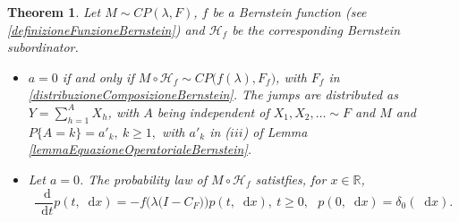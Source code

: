 \documentclass[12pt, twoside, english, headsepline]{article}
\newcommand*\dif{\mathop{}\!\mathrm{d}}  %
\newtheorem{theorem}{Theorem}[section] %
\theoremstyle{definition} %
\numberwithin{equation}{section} %
\begin{document}
%
%	


\begin{theorem}\label{teoremaComposizioneCompoundPoissonConSubordinatore}
Let $M\sim CP(\lambda, F)$, $f$ be a Bernstein function (see \eqref{definizioneFunzioneBernstein}) and $\mathcal{H}_f$ be the corresponding Bernstein subordinator.
\begin{itemize}
	\item[($i$)] $a=0$ if and only if $M\circ \mathcal{H}_f\sim CP\big(f(\lambda), F_f\big)$, with %
	$F_f$ in \eqref{distribuzioneComposizioneBernstein}. The jumps are distributed as $Y = \sum_{h=1}^A X_h$, with $A$ being independent of $X_1,X_2,\dots\sim F$ and $M$ and $P\{A = k\} = a'_k,\ k\ge1,$ with $a'_k$ in ($iii$) of Lemma \ref{lemmaEquazioneOperatorialeBernstein}.
	\item[($ii$)] Let $a=0$. The probability law of $M\circ\mathcal{H}_f$ satistfies, for $x\in\mathbb{R}$,	\begin{equation}\label{equazioneDifferenzialeOperatorialeFunzioneBernstein}
		\frac{\dif}{\dif t}p(t, \dif x) = - f\Big(\lambda\big(I-C_F\big)\Big)p(t, \dif x), \ t\ge0,\ \ \ p(0,\dif x) = \delta_0(\dif x).
	\end{equation}
\end{itemize}
\end{theorem}
\end{document}
